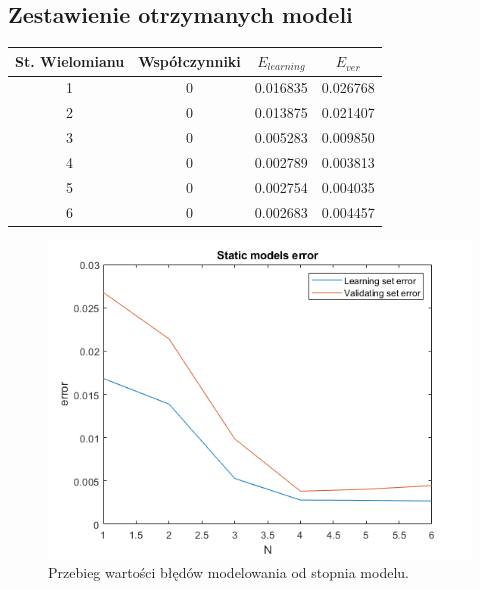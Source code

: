 \subsection{Zestawienie otrzymanych modeli}
\begin{table}[H]
\centering
\begin{tabular}{|c|c|c|c|}
\hline
St. Wielomianu & Współczynniki & $E_{learning}$ & $E_{ver}$ \\ \hline
1              & 0             & 0.016835              & 0.026768         \\ \hline
2              & 0             & 0.013875              & 0.021407         \\ \hline
3              & 0             & 0.005283              & 0.009850         \\ \hline
4              & 0             & 0.002789              & 0.003813         \\ \hline
5              & 0             & 0.002754              & 0.004035         \\ \hline
6              & 0             & 0.002683              & 0.004457         \\ \hline
\end{tabular}
\end{table}
\begin{figure}[H]
\centering
\includegraphics[width=15cm]{images/s_error.png}
\caption{Przebieg wartości błędów modelowania od stopnia modelu.}
\label{fig:s_error}
\end{figure}
